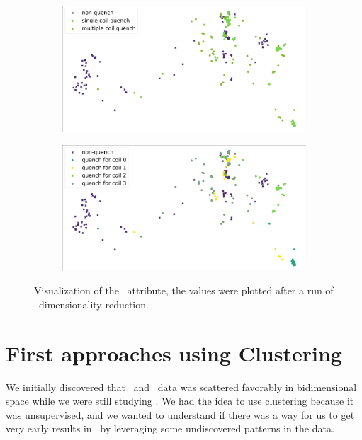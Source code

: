 \begin{figure}[!ht]
	\centering
	\begin{subfigure}{0.8\linewidth}
		\centering
		\includegraphics[width=\linewidth]{img/quench_dist_qlp/single_vs_multiple_Phi.png}
		\subcaption{}
	\end{subfigure}
	\begin{subfigure}{0.8\linewidth}
		\centering
		\includegraphics[width=\linewidth]{img/quench_dist_qlp_phi.png}
		\subcaption{}
	\end{subfigure}
	\caption{Visualization of the \phin\ attribute, the values were plotted after a run of \pca\
		dimensionality reduction.}
	\label{fig:phi-coilq-dist}
\end{figure}

\section{First approaches using Clustering}
We initially discovered that \an\ and \cnmod\ data was scattered favorably in bidimensional space
while we were still studying \qrp. We had the idea to use clustering because it was unsupervised,
and we wanted to understand if there was a way for us to get very early results in \qlp\ by
leveraging some undiscovered patterns in the data.

